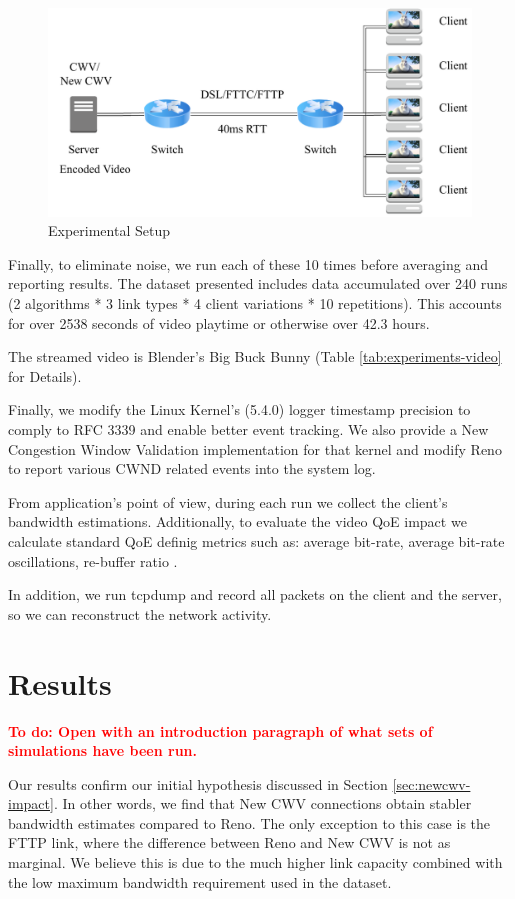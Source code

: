 \documentclass[10pt,sigconf]{acmart}
\newcommand{\todo}[1]{\textbf{\textcolor{red}{To do: #1}}}
\begin{document}
\begin{figure}
  \centering
  \includegraphics[width=.5\textwidth]{figures/setup.pdf}
  \caption{Experimental Setup}
  \label{fig:experimental-setup}
\end{figure}

Finally, to eliminate noise, we run each of these 10 times before averaging and reporting results. The dataset presented includes data accumulated over 240 runs (2 algorithms * 3 link types * 4 client variations * 10 repetitions). This accounts for over 2538 seconds of video playtime or otherwise over 42.3 hours.



The streamed video is Blender's Big Buck Bunny \cite{online-bbb} (Table \ref{tab:experiments-video} for Details).

Finally, we modify the Linux Kernel's (5.4.0) logger timestamp precision to comply to RFC 3339 and enable better event tracking. We also provide a New Congestion Window Validation \cite{rfc7661-2015-fairhurst-new-cwnd-validation} implementation for that kernel and modify Reno to report various CWND related events into the system log.

From application's point of view, during each run we collect the client's bandwidth estimations. Additionally, to evaluate the video QoE impact we calculate standard QoE definig metrics such as: average bit-rate, average bit-rate oscillations, re-buffer ratio \cite{Spiteri-2019-from-theory-to-practice-sabre, Yin-2015-a-control-theoritic-approach, Dobrian-2013-understanding-the-impact-of-video-quality}.

In addition, we run tcpdump and record all packets on the client and the server, so we can reconstruct the network activity.

\section{Results}

\todo{Open with an introduction paragraph of what sets of simulations have been run.}

Our results confirm our initial hypothesis discussed in Section \ref{sec:newcwv-impact}. In other words, we find that New CWV connections obtain stabler bandwidth estimates compared to Reno. The only exception to this case is the FTTP link, where the difference between Reno and New CWV is not as marginal. We believe this is due to the much higher link capacity combined with the low maximum bandwidth requirement used in the dataset.
\end{document}
